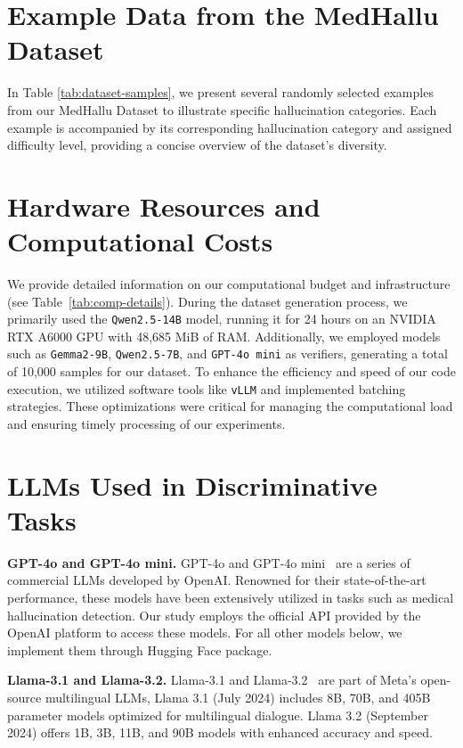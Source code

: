 



\section{Example Data from the MedHallu Dataset}
In Table \ref{tab:dataset-samples}, we present several randomly selected examples from our MedHallu Dataset to illustrate specific hallucination categories. Each example is accompanied by its corresponding hallucination category and assigned difficulty level, providing a concise overview of the dataset’s diversity.





\section{Hardware Resources and Computational Costs}

We provide detailed information on our computational budget and infrastructure (see Table~\ref{tab:comp-details}). During the dataset generation process, we primarily used the \texttt{Qwen2.5-14B} model, running it for 24 hours on an NVIDIA RTX A6000 GPU with 48,685 MiB of RAM. Additionally, we employed models such as \texttt{Gemma2-9B}, \texttt{Qwen2.5-7B}, and \texttt{GPT-4o mini} as verifiers, generating a total of 10,000 samples for our dataset. To enhance the efficiency and speed of our code execution, we utilized software tools like \texttt{vLLM} and implemented batching strategies. These optimizations were critical for managing the computational load and ensuring timely processing of our experiments.


\section{LLMs Used in Discriminative Tasks}

\textbf{GPT-4o and GPT-4o mini.} GPT-4o and GPT-4o mini~\cite{openai2024gpt4ocard} are a series of commercial LLMs developed by OpenAI. Renowned for their state-of-the-art performance, these models have been extensively utilized in tasks such as medical hallucination detection. Our study employs the official API provided by the OpenAI platform to access these models. For all other models below, we implement them through Hugging Face package.

\noindent \textbf{Llama-3.1 and Llama-3.2.} Llama-3.1 and Llama-3.2~\citep{grattafiori2024llama3herdmodels} are part of Meta's open-source multilingual LLMs, Llama 3.1 (July 2024) includes 8B, 70B, and 405B parameter models optimized for multilingual dialogue. Llama 3.2 (September 2024) offers 1B, 3B, 11B, and 90B models with enhanced accuracy and speed.


